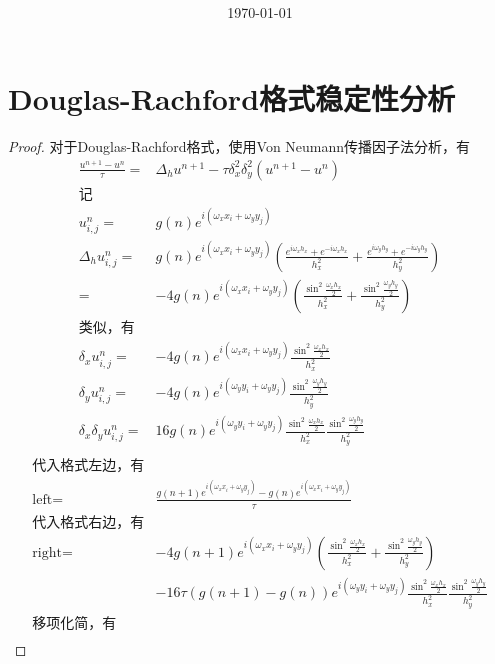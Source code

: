 \documentclass{article}%
\title{\heiti \myArticleName \\ [2ex] \begin{large} \myHomeworkNumber \end{large}}
\author{\kaishu \myName \myNumber}
\date{\today}
\begin{document}
\maketitle
\section{Douglas-Rachford格式稳定性分析}

\begin{proof}
	对于Douglas-Rachford格式，使用Von Neumann传播因子法分析，有
	\begin{align*}
		\frac{u^{n+1}-u^{n}}{\tau}=&\Delta_hu^{n+1}-\tau\delta^2_x\delta^2_y(u^{n+1}-u^{n}) \\
		\text{记}\\
		u^n_{i,j}=&g(n)e^{i(\omega _xx_i+\omega_yy_j)} \\
		\Delta_hu^n_{i,j}=&g(n)e^{i(\omega _xx_i+\omega_yy_j)}\left (\frac{e^{i\omega_xh_x}+e^{-i\omega_xh_x}}{h^2_x}+\frac{e^{i\omega_yh_y}+e^{-i\omega_yh_y}}{h^2_y}  \right ) \\
    =&-4g(n)e^{i(\omega _xx_i+\omega_yy_j)}\left (\frac{\sin ^2\frac{\omega_xh_x}{2}}{h^2_x}+\frac{\sin ^2\frac{\omega_yh_y}{2}}{h^2_y}  \right ) \\
		\text{类似，有}\\
		\delta_xu^n_{i,j}=&-4g(n)e^{i(\omega _xx_i+\omega_yy_j)}\frac{\sin ^2\frac{\omega_xh_x}{2}}{h^2_x}\\
    \delta_yu^n_{i,j}=&-4g(n)e^{i(\omega _yy_i+\omega_yy_j)}\frac{\sin ^2\frac{\omega_yh_y}{2}}{h^2_y}\\
    \delta_x\delta_yu^n_{i,j}=&16g(n)e^{i(\omega _yy_i+\omega_yy_j)}\frac{\sin ^2\frac{\omega_xh_x}{2}}{h^2_x}\frac{\sin ^2\frac{\omega_yh_y}{2}}{h^2_y}\\
\end{align*}
\begin{align*}
		\text{代入格式左边，有}\\
		\text{left}=&\frac{g(n+1)e^{i(\omega _xx_i+\omega_yy_j)}-g(n)e^{i(\omega _xx_i+\omega_yy_j)}}{\tau}\\
		\text{代入格式右边，有}\\
    \text{right}=&-4g(n+1)e^{i(\omega _xx_i+\omega_yy_j)}\left (\frac{\sin ^2\frac{\omega_xh_x}{2}}{h^2_x}+\frac{\sin ^2\frac{\omega_yh_y}{2}}{h^2_y}  \right )\\
    &-16\tau (g(n+1)-g(n))e^{i(\omega _yy_i+\omega_yy_j)}\frac{\sin ^2\frac{\omega_xh_x}{2}}{h^2_x}\frac{\sin ^2\frac{\omega_yh_y}{2}}{h^2_y} \\
		\text{移项化简，有}\\

\end{align*}
\end{proof}
\end{document}

